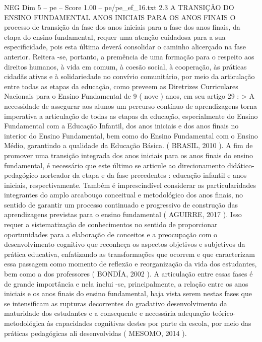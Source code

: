 \begin{textsample}{NEG Dim 5 – pe – Score 1.00 – pe/pe\_ef\_16.txt}  \label{ex:f5_neg_089}
2.3 A TRANSIÇÃO DO ENSINO FUNDAMENTAL ANOS INICIAIS PARA OS ANOS FINAIS O processo de transição da fase dos anos iniciais para a fase dos anos finais, da etapa do ensino fundamental, requer uma atenção cuidadosa para a sua especificidade, pois esta última deverá consolidar o caminho alicerçado na fase anterior.
Reitera -se, portanto, a premência de uma formação para o respeito aos direitos humanos, à vida em comum, à coesão social, à cooperação, às práticas cidadãs ativas e à solidariedade no convívio comunitário, por meio da articulação entre todas as etapas da educação, como preveem as Diretrizes Curriculares Nacionais para o Ensino Fundamental de 9 ( nove ) anos, em seu artigo 29 : > A necessidade de assegurar aos alunos um percurso contínuo de aprendizagens torna imperativa a articulação de todas as etapas da educação, especialmente do Ensino Fundamental com a Educação Infantil, dos anos iniciais e dos anos finais no interior do Ensino Fundamental, bem como do Ensino Fundamental com o Ensino Médio, garantindo a qualidade da Educação Básica. ( BRASIL, 2010 ).
A fim de promover uma transição integrada dos anos iniciais para os anos finais do ensino fundamental, é necessário que este último se articule ao direcionamento didático-pedagógico norteador da etapa e da fase precedentes : educação infantil e anos iniciais, respectivamente.
Também é imprescindível considerar as particularidades integrantes do amplo arcabouço conceitual e metodológico dos anos finais, no sentido de garantir um processo continuado e progressivo de construção das aprendizagens previstas para o ensino fundamental ( AGUIRRE, 2017 ).
Isso requer a sistematização de conhecimentos no sentido de proporcionar oportunidades para a elaboração de conceitos e a preocupação com o desenvolvimento cognitivo que reconheça os aspectos objetivos e subjetivos da prática educativa, enfatizando as transformações que ocorrem e que caracterizam essa passagem como momento de reflexão e reorganização da vida dos estudantes, bem como a dos professores ( BONDÍA, 2002 ).
A articulação entre essas fases é de grande importância e nela inclui -se, principalmente, a relação entre os anos iniciais e os anos finais do ensino fundamental, haja vista serem nestas fases que se intensificam as rupturas decorrentes do gradativo desenvolvimento da maturidade dos estudantes e a consequente e necessária adequação teórico-metodológica às capacidades cognitivas destes por parte da escola, por meio das práticas pedagógicas ali desenvolvidas ( MESOMO, 2014 ).

\end{textsample}
